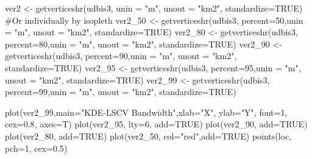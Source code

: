 \documentclass[
  letterpaper,
]{book}
\newenvironment{Shaded}{\begin{snugshade}}{\end{snugshade}}
\newcommand{\AttributeTok}[1]{\textcolor[rgb]{0.40,0.45,0.13}{#1}}
\newcommand{\CommentTok}[1]{\textcolor[rgb]{0.37,0.37,0.37}{#1}}
\newcommand{\ConstantTok}[1]{\textcolor[rgb]{0.56,0.35,0.01}{#1}}
\newcommand{\DecValTok}[1]{\textcolor[rgb]{0.68,0.00,0.00}{#1}}
\newcommand{\FloatTok}[1]{\textcolor[rgb]{0.68,0.00,0.00}{#1}}
\newcommand{\FunctionTok}[1]{\textcolor[rgb]{0.28,0.35,0.67}{#1}}
\newcommand{\NormalTok}[1]{\textcolor[rgb]{0.00,0.23,0.31}{#1}}
\newcommand{\OtherTok}[1]{\textcolor[rgb]{0.00,0.23,0.31}{#1}}
\newcommand{\StringTok}[1]{\textcolor[rgb]{0.13,0.47,0.30}{#1}}
\begin{document}
\begin{Shaded}
\begin{Highlighting}[]
\NormalTok{ver2 }\OtherTok{\textless{}{-}} \FunctionTok{getverticeshr}\NormalTok{(udbis3, }\AttributeTok{unin =} \StringTok{"m"}\NormalTok{, }\AttributeTok{unout =} \StringTok{"km2"}\NormalTok{, }\AttributeTok{standardize=}\ConstantTok{TRUE}\NormalTok{)}
\CommentTok{\#Or individually by isopleth}
\NormalTok{ver2\_50 }\OtherTok{\textless{}{-}} \FunctionTok{getverticeshr}\NormalTok{(udbis3, }\AttributeTok{percent=}\DecValTok{50}\NormalTok{,}\AttributeTok{unin =} \StringTok{"m"}\NormalTok{, }\AttributeTok{unout =} \StringTok{"km2"}\NormalTok{, }\AttributeTok{standardize=}\ConstantTok{TRUE}\NormalTok{)}
\NormalTok{ver2\_80 }\OtherTok{\textless{}{-}} \FunctionTok{getverticeshr}\NormalTok{(udbis3, }\AttributeTok{percent=}\DecValTok{80}\NormalTok{,}\AttributeTok{unin =} \StringTok{"m"}\NormalTok{, }\AttributeTok{unout =} \StringTok{"km2"}\NormalTok{, }\AttributeTok{standardize=}\ConstantTok{TRUE}\NormalTok{)}
\NormalTok{ver2\_90 }\OtherTok{\textless{}{-}} \FunctionTok{getverticeshr}\NormalTok{(udbis3, }\AttributeTok{percent=}\DecValTok{90}\NormalTok{,}\AttributeTok{unin =} \StringTok{"m"}\NormalTok{, }\AttributeTok{unout =} \StringTok{"km2"}\NormalTok{, }\AttributeTok{standardize=}\ConstantTok{TRUE}\NormalTok{)}
\NormalTok{ver2\_95 }\OtherTok{\textless{}{-}} \FunctionTok{getverticeshr}\NormalTok{(udbis3, }\AttributeTok{percent=}\DecValTok{95}\NormalTok{,}\AttributeTok{unin =} \StringTok{"m"}\NormalTok{, }\AttributeTok{unout =} \StringTok{"km2"}\NormalTok{, }\AttributeTok{standardize=}\ConstantTok{TRUE}\NormalTok{)}
\NormalTok{ver2\_99 }\OtherTok{\textless{}{-}} \FunctionTok{getverticeshr}\NormalTok{(udbis3, }\AttributeTok{percent=}\DecValTok{99}\NormalTok{,}\AttributeTok{unin =} \StringTok{"m"}\NormalTok{, }\AttributeTok{unout =} \StringTok{"km2"}\NormalTok{, }\AttributeTok{standardize=}\ConstantTok{TRUE}\NormalTok{)}

\FunctionTok{plot}\NormalTok{(ver2\_99,}\AttributeTok{main=}\StringTok{"KDE{-}LSCV Bandwidth"}\NormalTok{,}\AttributeTok{xlab=}\StringTok{"X"}\NormalTok{, }\AttributeTok{ylab=}\StringTok{"Y"}\NormalTok{, }\AttributeTok{font=}\DecValTok{1}\NormalTok{, }\AttributeTok{cex=}\FloatTok{0.8}\NormalTok{, }\AttributeTok{axes=}\NormalTok{T)}
\FunctionTok{plot}\NormalTok{(ver2\_95, }\AttributeTok{lty=}\DecValTok{6}\NormalTok{, }\AttributeTok{add=}\ConstantTok{TRUE}\NormalTok{)}
\FunctionTok{plot}\NormalTok{(ver2\_90, }\AttributeTok{add=}\ConstantTok{TRUE}\NormalTok{)}
\FunctionTok{plot}\NormalTok{(ver2\_80, }\AttributeTok{add=}\ConstantTok{TRUE}\NormalTok{)}
\FunctionTok{plot}\NormalTok{(ver2\_50, }\AttributeTok{col=}\StringTok{"red"}\NormalTok{,}\AttributeTok{add=}\ConstantTok{TRUE}\NormalTok{)}
\FunctionTok{points}\NormalTok{(loc, }\AttributeTok{pch=}\DecValTok{1}\NormalTok{, }\AttributeTok{cex=}\FloatTok{0.5}\NormalTok{)}
\end{Highlighting}
\end{Shaded}
\end{document}
